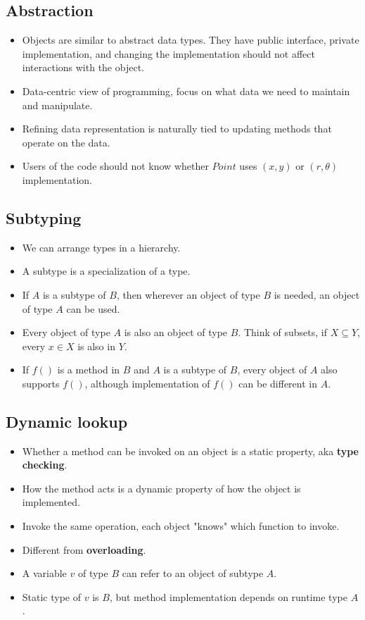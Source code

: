 \documentclass[a4paper]{article}
\begin{document}
\subsection{Abstraction}
\begin{itemize}
    \item Objects are similar to abstract data types. They have public interface, private implementation, and changing the implementation should not affect interactions with the object.
    \item Data-centric view of programming, focus on what data we need to maintain and manipulate.
    \item Refining data representation is naturally tied to updating methods that operate on the data.
    \item Users of the code should not know whether $Point$ uses $(x,y)$ or $(r,\theta)$ implementation.
\end{itemize}

\subsection{Subtyping}
\begin{itemize}
    \item We can arrange types in a hierarchy.
    \item A subtype is a specialization of a type.
    \item If $A$ is a subtype of $B$, then wherever an object of type $B$ is needed, an object of type $A$ can be used.
    \item Every object of type $A$ is also an object of type $B$. Think of subsets, if $X\subseteq Y$, every $x\in X$ is also in $Y$.
    \item If $f()$ is a method in $B$ and $A$ is a subtype of $B$, every object of $A$ also supports $f()$, although implementation of $f()$ can be different in $A$.
\end{itemize}

\subsection{Dynamic lookup}
\begin{itemize}
    \item Whether a method can be invoked on an object is a static property, aka \textbf{type checking}.
    \item How the method acts is a dynamic property of how the object is implemented.
    \item Invoke the same operation, each object "knows" which function to invoke.
    \item Different from \textbf{overloading}.
    \item A variable $v$ of type $B$ can refer to an object of subtype $A$.
    \item Static type of $v$ is $B$, but method implementation depends on runtime type $A$.
\end{itemize}
\end{document}

